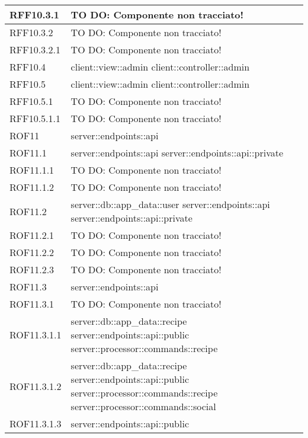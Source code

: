 \begin{center}
\begin{longtable}{| p{4cm} | p{8cm} |}
\hline
RFF10.3.1 & TO DO: Componente non tracciato! \\
\hline
RFF10.3.2 & TO DO: Componente non tracciato! \\
\hline
RFF10.3.2.1 & TO DO: Componente non tracciato! \\
\hline
RFF10.4 & client::view::admin \newline client::controller::admin \\
\hline
RFF10.5 & client::view::admin \newline client::controller::admin \\
\hline
RFF10.5.1 & TO DO: Componente non tracciato! \\
\hline
RFF10.5.1.1 & TO DO: Componente non tracciato! \\
\hline
ROF11 & server::endpoints::api \\
\hline
ROF11.1 & server::endpoints::api \newline server::endpoints::api::private \\
\hline
ROF11.1.1 & TO DO: Componente non tracciato! \\
\hline
ROF11.1.2 & TO DO: Componente non tracciato! \\
\hline
ROF11.2 & server::db::app\_data::user \newline server::endpoints::api \newline server::endpoints::api::private \\
\hline
ROF11.2.1 & TO DO: Componente non tracciato! \\
\hline
ROF11.2.2 & TO DO: Componente non tracciato! \\
\hline
ROF11.2.3 & TO DO: Componente non tracciato! \\
\hline
ROF11.3 & server::endpoints::api \\
\hline
ROF11.3.1 & TO DO: Componente non tracciato! \\
\hline
ROF11.3.1.1 & server::db::app\_data::recipe \newline server::endpoints::api::public \newline server::processor::commands::recipe \\
\hline
ROF11.3.1.2 & server::db::app\_data::recipe \newline server::endpoints::api::public \newline server::processor::commands::recipe \newline server::processor::commands::social \\
\hline
ROF11.3.1.3 & server::endpoints::api::public \\

\end{longtable}
\end{center}
